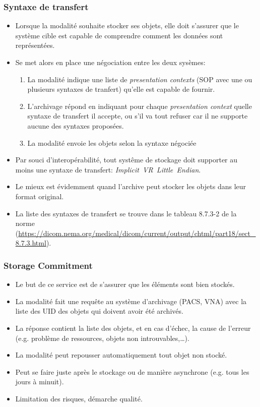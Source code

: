     \frame
	{
		\frametitle{Syntaxe de transfert}
		\begin{itemize}
			\item Lorsque la modalit\'e souhaite stocker ses objets, elle doit s'assurer que le syst\`eme cible est capable de comprendre comment les donn\'ees sont repr\'esent\'ees.
			\item<2-> Se met alors en place une n\'egociation entre les deux sys\`emes:
			\begin{enumerate}
				\item<3-> La modalit\'e indique une liste de \emph{presentation contexts} (SOP avec une ou plusieurs syntaxes de tranfert) qu'elle est capable de fournir.
				\item<4-> L'archivage r\'epond en indiquant pour chaque \emph{presentation context} quelle syntaxe de transfert il accepte, ou s'il va tout refuser car il ne supporte aucune des syntaxes propos\'ees.
				\item<5-> La modalit\'e envoie les objets selon la syntaxe n\'egoci\'ee
			\end{enumerate}
			\item<6-> Par souci d'interop\'erabilit\'e, tout syst\^eme de stockage doit supporter au moins une syntaxe de transfert: \emph{Implicit~VR~Little~Endian}.
			\item<7-> Le mieux est \'evidemment quand l'archive peut stocker les objets dans leur format original.
			\item<8-> La liste des syntaxes de transfert se trouve dans le tableau 8.7.3{-}2 de la norme (\url{https://dicom.nema.org/medical/dicom/current/output/chtml/part18/sect_8.7.3.html}).
		\end{itemize}
	}

	\frame
	{
		\frametitle{Storage Commitment}
		\begin{itemize}
			\item Le but de ce service est de s'assurer que les \'el\'ements sont bien stock\'es.
			\item<2-> La modalit\'e fait une requ\^ete au syst\`eme d'archivage (PACS, VNA) avec la liste des UID des objets qui doivent avoir \'et\'e archiv\'es.
			\item<3-> La r\'eponse contient la liste des objets, et en cas d'\'echec, la cause de l'erreur (e.g. probl\`eme de ressources, objets non introuvables,\ldots).
			\item<4-> La modalit\'e peut repousser automatiquement tout objet non stock\'e.
			\item<5-> Peut se faire juste apr\`es le stockage ou de mani\`ere asynchrone (e.g. tous les jours \`a minuit).
			\item<6-> Limitation des risques, d\'emarche qualit\'e.
		\end{itemize}
	}
	
